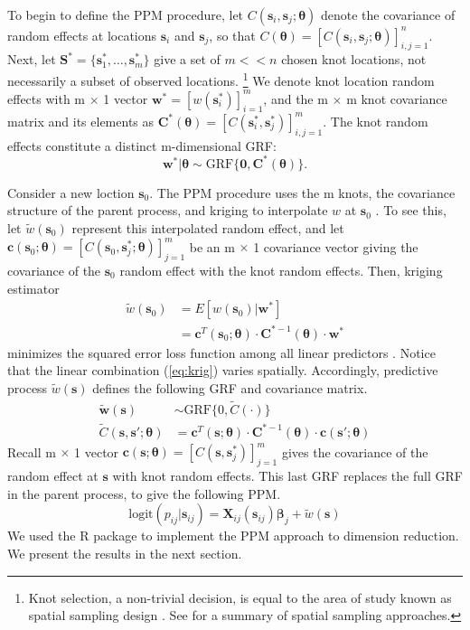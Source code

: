 To begin to define the PPM procedure, let $C(\pmb{s}_{i}, \pmb{s}_{j}; \pmb{\theta})$ denote the covariance of random effects at locations $\pmb{s}_{i}$ and $\pmb{s}_{j}$, so that $C(\pmb{\theta}) = [C(\pmb{s}_{i}, \pmb{s}_{j}; \pmb{\theta})]_{i,j=1}^{n}$. Next, let $\pmb{S}^{*} = \{\pmb{s}_{1}^{*}, \dots, \pmb{s}_{m}^{*}\}$ give a set of $m << n$ chosen knot locations, not necessarily a subset of observed locations. \footnote{Knot selection, a non-trivial decision, is equal to the area of study known as spatial sampling design \citep{Finley2009}. See \citep{Xia2006} for a summary of spatial sampling approaches.} We denote knot location random effects with m $\times$ 1 vector $\pmb{w}^{*} = \left[w(\pmb{s}_{i}^{*})\right]_{i=1}^{m}$, and the m $\times$ m knot covariance matrix and its elements as $\pmb{C}^{*}(\pmb{\theta}) = \left[C(\pmb{s}_{i}^{*}, \pmb{s}_{j}^{*})\right]_{i,j = 1}^{m}$. The knot random effects constitute a distinct m-dimensional GRF:
\begin{equation}
\pmb{w}^{*}|\pmb{\theta} \sim \text{GRF}\{\pmb{0}, \pmb{C}^{*}(\pmb{\theta})\}.
\end{equation}

Consider a new loction $\pmb{s}_{0}$. The PPM procedure uses the m knots, the covariance structure of the parent process, and kriging to interpolate $w$ at $\pmb{s}_{0}$ \citep{Schabenberger2004}. To see this, let $\tilde{w}(\pmb{s}_{0})$ represent this interpolated random effect, and let $\pmb{c}(\pmb{s}_{0};\pmb{\theta}) = \left[C(\pmb{s}_{0}, \pmb{s}_{j}^{*}; \pmb{\theta})\right]_{j = 1}^{m}$ be an m $\times$ 1 covariance vector giving the covariance of the $\pmb{s}_{0}$ random effect with the knot random effects. Then,  kriging estimator
\begin{align}
\tilde{w}(\pmb{s}_{0}) &= E[w(\pmb{s}_{0})|\pmb{w}^{*}] \\ 
&= \pmb{c}^{T}(\pmb{s}_{0};\pmb{\theta}) \cdot \pmb{C}^{*-1}(\pmb{\theta}) \cdot \pmb{w}^{*} \label{eq:krig}
\end{align}
minimizes the squared error loss function among all linear predictors \citep{Schabenberger2004}. Notice that the linear combination (\ref{eq:krig}) varies spatially. Accordingly, predictive process $\tilde{w}(\pmb{s})$ defines the following GRF and covariance matrix.
\begin{align}
\tilde{\pmb{w}}(\pmb{s}) &\sim \text{GRF}\{0, \tilde{C}(\cdot)\} \\
\tilde{C}(\pmb{s}, \pmb{s}'; \pmb{\theta}) &= \pmb{c}^{T}(\pmb{s};\pmb{\theta}) \cdot \pmb{C}^{*-1}(\pmb{\theta}) \cdot \pmb{c}(\pmb{s}';\pmb{\theta})
\end{align}
Recall m $\times$ 1 vector $\pmb{c}(\pmb{s};\pmb{\theta}) = \left[C(\pmb{s}, \pmb{s}_{j}^{*})\right]_{j = 1}^{m}$ gives the covariance of the random effect at $\pmb{s}$ with knot random effects. This last GRF replaces the full GRF in the parent process, to give the following PPM.
\begin{equation}
\text{logit}(p_{ij}|\pmb{s}_{ij}) = \pmb{X}_{ij}(\pmb{s}_{ij}) \pmb{\beta}_{j} + \tilde{w}(\pmb{s})
\end{equation}
We used the R package  to implement the PPM approach to dimension reduction. We present the results in the next section.

